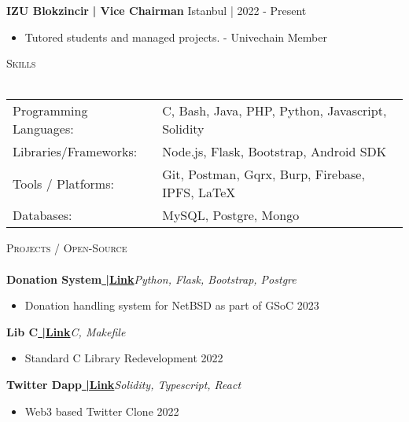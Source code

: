 \documentclass[a4paper]{article}
\newcommand{\lineunder} {
    \vspace*{-8pt} \\
    \hspace*{-18pt} \hrulefill \\
}
\newcommand{\header} [1] {
    {\hspace*{-18pt}\vspace*{6pt} \textsc{#1}}
    \vspace*{-6pt} \lineunder
}
\begin{document}
      \textbf{IZU Blokzincir}\textbf{ | Vice Chairman} \hfill Istanbul | 2022 - Present\\
     
          \vspace{-3mm}
\begin{itemize} \itemsep -3pt
\item[] Tutored students and managed projects. - Univechain Member
\end{itemize}

%
%
  \header{Skills}
  \vspace{2mm}
  \begin{longtable}{p{4cm}p{12cm}}
  Programming Languages: & C, Bash, Java, PHP, Python, Javascript, Solidity \\
  Libraries/Frameworks: & Node.js, Flask, Bootstrap, Android SDK  \\
  Tools / Platforms: & Git, Postman, Gqrx, Burp, Firebase, IPFS, \LaTeX \\
  Databases: & MySQL, Postgre, Mongo \\
  \end{longtable}
  \vspace{1mm}

      \header{Projects / Open-Source}
      \vspace{2mm}
      {\textbf{Donation System}}\textbf{\href{https://github.com/goeksu/NetBSD-Donation-Automation}{\scriptsize{ |Link}}}\hfill{\sl Python, Flask, Bootstrap, Postgre}\\
          \vspace{-3mm}
\begin{itemize} \itemsep -3pt
\item[] Donation handling system for NetBSD as part of GSoC \hfill{2023}\\
\end{itemize}
          \vspace*{3mm}
       {\textbf{Lib C}}\textbf{\href{https://github.com/goeksu/libc}{\scriptsize{ |Link}}}\hfill{\sl C, Makefile}\\
          \vspace{-3mm}
\begin{itemize} \itemsep -3pt
\item[] Standard C Library Redevelopment \hfill{2022}\\
\end{itemize}
          \vspace*{3mm}
      {\textbf{Twitter Dapp}}\textbf{\href{https://github.com/goeksu/Twitter-without-Elon-Dapp}{\scriptsize{ |Link}}}\hfill{\sl Solidity, Typescript, React}\\
          \vspace{-3mm}
\begin{itemize} \itemsep -3pt
\item[] Web3 based Twitter Clone \hfill{2022}\\
\end{itemize}
          \vspace*{3mm}
\end{document}
